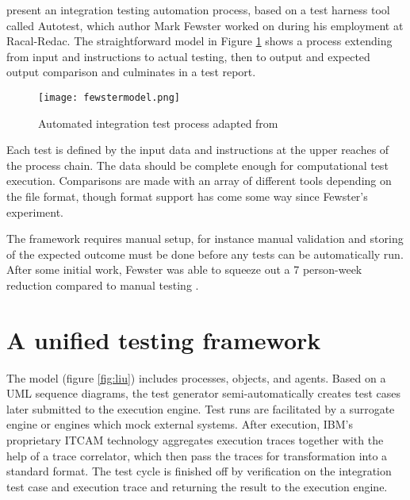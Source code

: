 \documentclass[12pt,a4paper,oneside,pdftex]{report}
\begin{document}
\citet{fewster1999software} present an integration testing automation process, based on a test harness tool called Autotest, which author Mark Fewster worked on during his employment at Racal-Redac. The straightforward model in Figure \ref{fig:autotestprocess} shows a process extending from input and instructions to actual testing, then to output and expected output comparison and culminates in a test report.

\begin{figure}[H]
  \begin{center}
    \texttt{[image: fewstermodel.png]}
    \caption{Automated integration test process adapted from \citep{fewster1999software}}
    \label{fig:autotestprocess}
  \end{center}
\end{figure}

Each test is defined by the input data and instructions at the upper reaches of the process chain. The data should be complete enough for computational test execution. Comparisons are made with an array of different tools depending on the file format, though format support has come some way since Fewster's experiment.

The framework requires manual setup, for instance manual validation and storing of the expected outcome must be done before any tests can be automatically run. After some initial work, Fewster was able to squeeze out a 7 person-week reduction compared to manual testing \citep{fewster1999software}.


\section{A unified testing framework}

The \citet{liu2009unified} model (figure \ref{fig:liu}) includes processes, objects, and agents. Based on a UML sequence diagrams, the test generator semi-automatically creates test cases later submitted to the execution engine. Test runs are facilitated by a surrogate engine or engines which mock external systems. After execution, IBM's proprietary ITCAM technology aggregates execution traces together with the help of a trace correlator, which then pass the traces for transformation into a standard format. The test cycle is finished off by verification on the integration test case and execution trace and returning the result to the execution engine.
\end{document}
